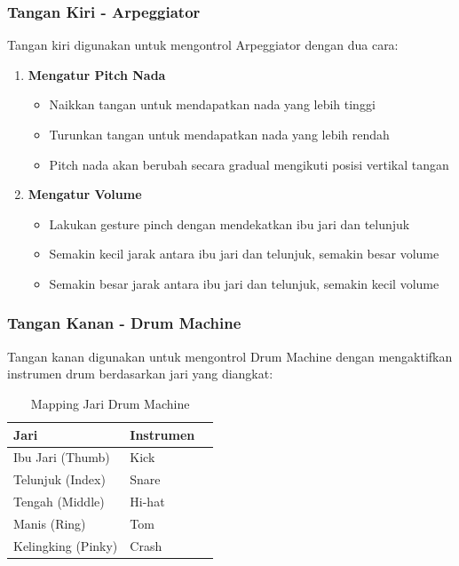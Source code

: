 \subsubsection{Tangan Kiri - Arpeggiator}
Tangan kiri digunakan untuk mengontrol Arpeggiator dengan dua cara:

\begin{enumerate}
    \item \textbf{Mengatur Pitch Nada}
    \begin{itemize}
        \item Naikkan tangan untuk mendapatkan nada yang lebih tinggi
        \item Turunkan tangan untuk mendapatkan nada yang lebih rendah
        \item Pitch nada akan berubah secara gradual mengikuti posisi vertikal tangan
    \end{itemize}
    
    \item \textbf{Mengatur Volume}
    \begin{itemize}
        \item Lakukan gesture pinch dengan mendekatkan ibu jari dan telunjuk
        \item Semakin kecil jarak antara ibu jari dan telunjuk, semakin besar volume
        \item Semakin besar jarak antara ibu jari dan telunjuk, semakin kecil volume
    \end{itemize}
\end{enumerate}

\subsubsection{Tangan Kanan - Drum Machine}
Tangan kanan digunakan untuk mengontrol Drum Machine dengan mengaktifkan instrumen drum berdasarkan jari yang diangkat:

\begin{table}[H]
\centering
\caption{Mapping Jari Drum Machine}
\label{tab:drum-mapping}
\begin{tabular}{lll}
\hline
\textbf{Jari} & \textbf{Instrumen} \\ \hline
Ibu Jari (Thumb) & Kick \\
Telunjuk (Index) & Snare \\
Tengah (Middle) & Hi-hat \\
Manis (Ring) & Tom \\
Kelingking (Pinky) & Crash \\
\hline
\end{tabular}
\end{table}

